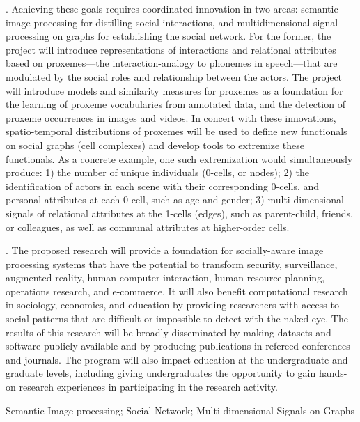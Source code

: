 . Achieving these goals requires coordinated innovation in two areas: semantic image processing for distilling social interactions, and multidimensional signal processing on graphs for establishing the social network.  For the former, the project will introduce representations of interactions and relational attributes based on proxemes---the interaction-analogy to phonemes in speech---that are modulated by the social roles and relationship between the actors. The project will introduce models and similarity measures for proxemes as a foundation for the learning of proxeme vocabularies from annotated data, and the detection of proxeme occurrences in images and videos. In concert with these innovations, spatio-temporal distributions of proxemes will be used to define new functionals on social graphs (cell complexes) and develop tools to extremize these functionals. As a concrete example, one such extremization would simultaneously produce: 1) the number of unique individuals (0-cells, or nodes); 2) the identification of actors in each scene with their corresponding 0-cells, and personal attributes at each 0-cell, such as age and gender; 3) multi-dimensional signals of relational attributes at the 1-cells (edges), such as parent-child, friends, or colleagues, as well as communal attributes at higher-order cells.

. The proposed research will provide a foundation for socially-aware image processing systems that have the potential to transform security, surveillance, augmented reality, human computer interaction, human resource planning, operations research, and e-commerce. It will also benefit computational research in sociology, economics, and education by providing researchers with access to social patterns that are difficult or impossible to detect with the naked eye. The results of this research will be broadly disseminated by making datasets and software publicly available and by producing publications in refereed conferences and journals. The program will also impact education at the undergraduate and graduate levels, including giving undergraduates the opportunity to gain hands-on research experiences in participating in the research activity. 

 Semantic Image processing; Social Network; Multi-dimensional Signals on Graphs



